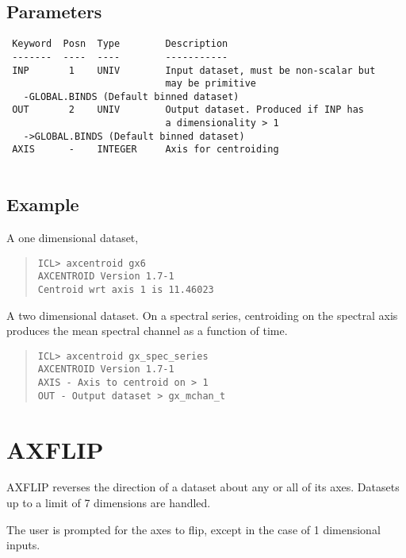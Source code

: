 \documentclass{book}
\renewcommand{\_}{{\tt\char'137}}     %
\begin{document}
\subsection{Parameters}
\begin{verbatim}
 Keyword  Posn  Type        Description
 -------  ----  ----        -----------
 INP       1    UNIV        Input dataset, must be non-scalar but
                            may be primitive
   -GLOBAL.BINDS (Default binned dataset)
 OUT       2    UNIV        Output dataset. Produced if INP has
                            a dimensionality > 1
   ->GLOBAL.BINDS (Default binned dataset)
 AXIS      -    INTEGER     Axis for centroiding
 
\end{verbatim}\subsection{Example}
A one dimensional dataset,
 
\begin{quote}\begin{verbatim}
ICL> axcentroid gx6
AXCENTROID Version 1.7-1
Centroid wrt axis 1 is 11.46023
\end{verbatim}\end{quote}
A two dimensional dataset. On a spectral series, centroiding on the
spectral axis produces the mean spectral channel as a function of
time.
 
\begin{quote}\begin{verbatim}
ICL> axcentroid gx_spec_series
AXCENTROID Version 1.7-1
AXIS - Axis to centroid on > 1
OUT - Output dataset > gx_mchan_t
\end{verbatim}\end{quote}
\section{AXFLIP}
AXFLIP reverses the direction of a dataset about any or all of its
axes. Datasets up to a limit of 7 dimensions are handled.
 
The user is prompted for the axes to flip, except in the case of
1 dimensional inputs.
 
\end{document}
